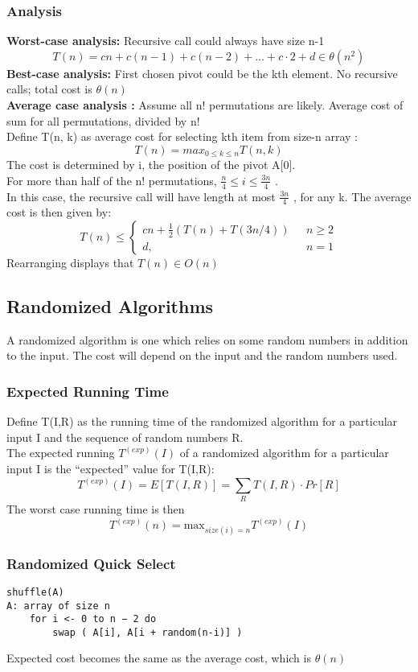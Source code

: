 \documentclass{article}
\begin{document}
\subsubsection*{Analysis}
\textbf{Worst-case analysis:} Recursive call could always have size n-1
$$ T(n) = cn + c(n -1) + c(n -2) + \ldots + c \cdot 2 + d \in \theta(n^2) $$
\textbf{Best-case analysis:} First chosen pivot could be the kth element. No recursive calls; total cost is \(\theta(n)\) \\
\newline
\textbf{Average case analysis : } Assume all n! permutations are likely. Average cost of sum for all permutations, divided by n!\\
Define T(n, k) as average cost for selecting kth item from size-n array : 
$$T(n) = {max}_{0 \leq k \leq n} T(n,k) $$
The cost is determined by i, the position of the pivot A[0].\\
For more than half of the n! permutations, \(\frac{n}{4} \leq i \leq \frac{3n}{4}\) . \\
In this case, the recursive call will have length at most \(\frac{3n}{4}\) , for any k.
 The average cost is then given by:
 $$ T(n) \leq \begin{cases} cn + \frac{1}{2} (T(n) + T(3n/4)) \text{ } & n \geq 2 \\
 d, &  n = 1\end{cases}$$
 Rearranging displays that \(T(n) \in O(n)\)

\subsection{Randomized Algorithms}
A randomized algorithm is one which relies on some random numbers in addition to the input.
The cost will depend on the input and the random numbers used.

\subsubsection*{Expected Running Time}
Define T(I,R) as the running time of the randomized algorithm for a particular input I and the sequence of random numbers R.\\
The expected running \(T^{(exp)}(I)\) of a randomized algorithm for a particular input I is the “expected” value for T(I,R):
$$ T^{(exp)}(I) = E[T(I, R)] = \sum_R T(I,R) \cdot Pr[R] $$
The worst case running time is then 
$$ T^{(exp)}(n) = \text{max}_{size(i) = n} T^{(exp)}(I) $$

\subsubsection*{Randomized Quick Select }
\begin{lstlisting}
shuffle(A)
A: array of size n
	for i <- 0 to n − 2 do
		swap ( A[i], A[i + random(n-i)] )
\end{lstlisting}
Expected cost becomes the same as the average cost, which is \(\theta(n)\)
\end{document}
